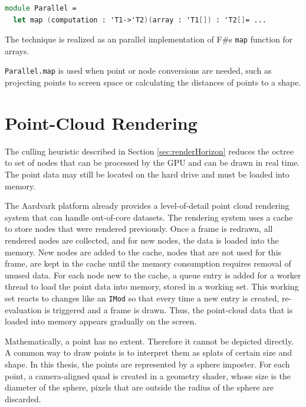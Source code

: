 \begin{lstlisting}[language = FSharp]
module Parallel = 
  let map (computation : 'T1->'T2)(array : 'T1[]) : 'T2[]= ...
\end{lstlisting}
The technique is realized as an parallel implementation of F\#s \verb|map| function for arrays. 

\verb|Parallel.map| is used when point or node conversions are needed, such as projecting points to screen space or calculating the distances of points to a shape. 


\section{Point-Cloud Rendering}
\label{sec:rendering}

The culling heuristic described in Section \ref{sec:renderHorizon} reduces the octree to set of nodes that can be processed by the GPU and can be drawn in real time. The point data may still be located on the hard drive and must be loaded into memory. 

\par

The Aardvark platform already provides a level-of-detail point cloud rendering system that can handle out-of-core datasets. The rendering system uses a cache to store nodes that were rendered previously. Once a frame is redrawn, all rendered nodes are collected, and for new nodes, the data is loaded into the memory. New nodes are added to the cache, nodes that are not used for this frame, are kept in the cache until the memory consumption requires removal of unused data. For each node new to the cache, a queue entry is added for a worker thread to load the point data into memory, stored in a working set. This working set reacts to changes like an \verb|IMod| so that every time a new entry is created, re-evaluation is triggered and a frame is drawn. Thus, the point-cloud data that is loaded into memory appears gradually on the screen. 

\par

Mathematically, a point has no extent. Therefore it cannot be depicted directly. A common way to draw points is to interpret them as splats of certain size and shape. In this thesis, the points are represented by a sphere imposter. For each point, a camera-aligned quad is created in a geometry shader, whose size is the diameter of the sphere, pixels that are outside the radius of the sphere are discarded. 

